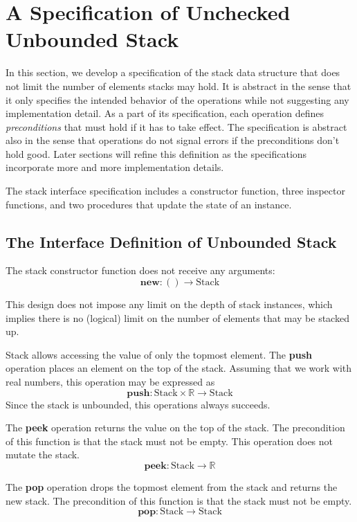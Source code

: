 \documentclass[10pt]{article}
\begin{document}
\section{A Specification of Unchecked Unbounded Stack}
\noindent In this section, we develop a specification of the stack data structure that does not limit the number of elements stacks may hold. It is abstract in the sense that it only specifies the intended behavior of the operations while not suggesting any implementation detail. As a part of its specification, each operation defines \emph{preconditions} that must hold if it has to take effect. The specification is abstract also in the sense that operations do not signal errors if the preconditions don't hold good. Later sections will refine this definition as the specifications incorporate more and more implementation details.

The stack interface specification includes a constructor function, three inspector functions, and two procedures that update the state of an instance. 

\subsection{The Interface Definition of Unbounded Stack}
\noindent The stack constructor function does not receive any arguments:
\[
\textbf{new}: \mathbf{()} \rightarrow \mathrm{Stack}
\]

\noindent This design does not impose any limit on the depth of stack instances, which implies there is no (logical) limit on the number of elements that may be stacked up.

Stack allows accessing the value of only the topmost element. The \textbf{push} operation places an element on the top of the stack. Assuming that we work with real numbers, this operation may be expressed as
\[
\textbf{push}: \mathrm{Stack} \times \mathbb{R} \rightarrow \mathrm{Stack}
\]
Since the stack is unbounded, this operations always succeeds.

The \textbf{peek} operation returns the value on the top of the stack. The precondition of this function is that the stack must not be empty. This operation does not mutate the stack.
\[
\textbf{peek}: \mathrm{Stack} \rightarrow {\mathbb{R}}
\]

The {\textbf{pop}} operation drops the topmost element from the stack and returns the new stack. The precondition of this function is that the stack must not be empty.
\[
\textbf{pop}: \mathrm{Stack} \rightarrow \mathrm{Stack}
\]
\end{document}

